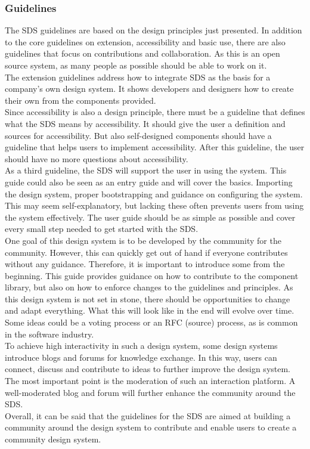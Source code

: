 \subsubsection*{Guidelines}
The SDS guidelines are based on the design principles just presented. In addition to the core guidelines on extension, accessibility and basic use, there are also guidelines that focus on contributions and collaboration. As this is an open source system, as many people as possible should be able to work on it. \\
The extension guidelines address how to integrate SDS as the basis for a company's own design system. It shows developers and designers how to create their own from the components provided. \\
Since accessibility is also a design principle, there must be a guideline that defines what the SDS means by accessibility. It should give the user a definition and sources for accessibility. But also self-designed components should have a guideline that helps users to implement accessibility. After this guideline, the user should have no more questions about accessibility. \\
As a third guideline, the SDS will support the user in using the system. This guide could also be seen as an entry guide and will cover the basics. Importing the design system, proper bootstrapping and guidance on configuring the system. This may seem self-explanatory, but lacking these often prevents users from using the system effectively. The user guide should be as simple as possible and cover every small step needed to get started with the SDS. \\
One goal of this design system is to be developed by the community for the community. However, this can quickly get out of hand if everyone contributes without any guidance. Therefore, it is important to introduce some from the beginning. This guide provides guidance on how to contribute to the component library, but also on how to enforce changes to the guidelines and principles. As this design system is not set in stone, there should be opportunities to change and adapt everything. What this will look like in the end will evolve over time. Some ideas could be a voting process or an RFC (source) process, as is common in the software industry. \\
To achieve high interactivity in such a design system, some design systems introduce blogs and forums for knowledge exchange. In this way, users can connect, discuss and contribute to ideas to further improve the design system. The most important point is the moderation of such an interaction platform. A well-moderated blog and forum will further enhance the community around the SDS. \\
Overall, it can be said that the guidelines for the SDS are aimed at building a community around the design system to contribute and enable users to create a community design system. 
